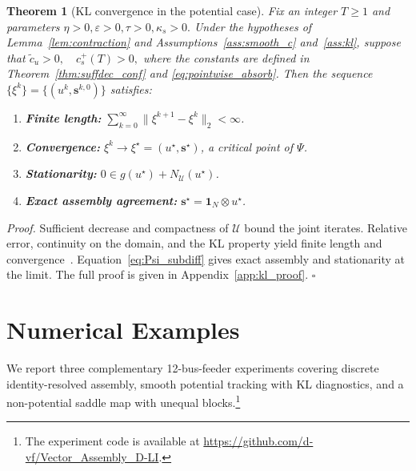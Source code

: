 \documentclass[letterpaper, 10 pt, conference]{ieeeconf} %
\newenvironment{proof}[1][Proof]{\par\noindent\textit{#1. }\ignorespaces}
  {\hfill$\square$\par}
\newtheorem{theorem}{Theorem}
\begin{document}
\begin{theorem}[KL convergence in the potential case]
\label{thm:kl_conf}
Fix an integer \(T\ge1\) and parameters \(\eta>0, \varepsilon>0, \tau>0, \kappa_s>0.\)
Under the hypotheses of Lemma~\ref{lem:contraction} and Assumptions~\ref{ass:smooth_c} and~\ref{ass:kl}, suppose that
\(\tilde c_u>0, \quad c_s^{+}(T)>0,\) where the constants are defined in Theorem~\ref{thm:suffdec_conf} and \eqref{eq:pointwise_absorb}. Then the sequence \(\{\xi^k\}=\{(u^k,\mathbf s^{k,0})\}\) satisfies:
\begin{enumerate}
\setlength{\topsep}{1pt}
\setlength{\itemsep}{0pt}
\setlength{\parsep}{0pt}
\setlength{\partopsep}{0pt}
\item \textbf{Finite length:}
\(\sum_{k=0}^\infty\|\xi^{k+1}-\xi^k\|_2<\infty\).
\item \textbf{Convergence:}
\(\xi^k\to\xi^\star=(u^\star,\mathbf s^\star)\),
a critical point of \(\Psi\).
\item \textbf{Stationarity:}
\(0\in g(u^\star)+N_{\mathcal U}(u^\star)\).
\item \textbf{Exact assembly agreement:}
\(\mathbf s^\star=\mathbf 1_N\otimes u^\star\).
\end{enumerate}
\end{theorem}

\begin{proof}
Sufficient decrease and compactness of \(\mathcal U\) bound the joint iterates. Relative error, continuity on the domain, and the KL property yield finite length and convergence~\cite{attouch_convergence_2013}. Equation~\eqref{eq:Psi_subdiff} gives exact assembly and stationarity at the limit. The full proof is given in Appendix~\ref{app:kl_proof}.
\end{proof}

\section{Numerical Examples}\label{sec:numerical}
We report three complementary 12-bus-feeder experiments covering discrete identity-resolved assembly, smooth potential tracking with KL diagnostics, and a non-potential saddle map with unequal blocks.\footnote{The experiment code is available at \url{https://github.com/d-vf/Vector_Assembly_D-LI}.}
\end{document}
